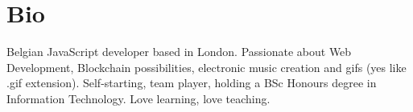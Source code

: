 \documentclass[]{my-resume}
\begin{document}
\begin{minipage}[t]{0.33\textwidth}

\section{Bio}
Belgian JavaScript developer based in London. Passionate about Web Development, Blockchain possibilities, electronic music creation and gifs (yes like .gif extension).
Self-starting, team player, holding a BSc Honours degree in Information Technology. 
Love learning, love teaching.
\sectionsep


\end{minipage} 
\hfill
\end{document}

